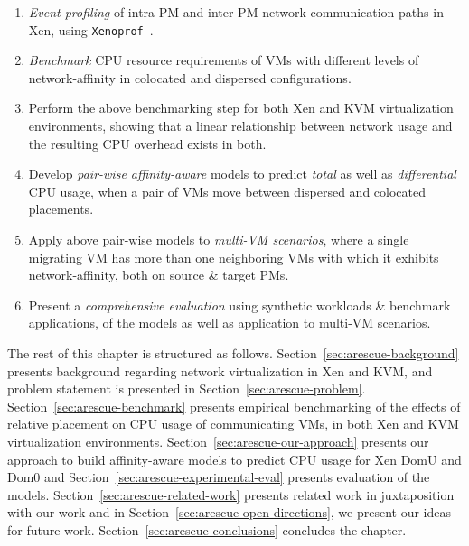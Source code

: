 \begin{enumerate}	
\item \emph{Event profiling} of intra-PM and inter-PM network
	communication paths in Xen, using \texttt{Xenoprof}~\cite{xenoprof}.
\item \emph{Benchmark} CPU resource requirements
of VMs with different levels of network-affinity
in colocated and dispersed configurations.
\item Perform the above benchmarking step for both Xen and KVM virtualization environments,
	showing that a linear relationship between network usage and the resulting CPU overhead
	exists in both.
\item Develop \emph{pair-wise affinity-aware} models to predict \textit{total}
	as well as \textit{differential} CPU usage, when a pair of VMs move between
	dispersed and colocated placements.
\item Apply above pair-wise models to \emph{multi-VM scenarios}, where
	a single migrating VM has more than one neighboring
	VMs with which it exhibits network-affinity, both on source \& target PMs.
\item Present a \emph{comprehensive evaluation} using synthetic 
	workloads \& benchmark applications,
	of the models as well as application to multi-VM scenarios.
\end{enumerate}

\noindent The rest of this chapter is structured as follows. 
Section~\ref{sec:arescue-background}
presents background regarding network virtualization in Xen and KVM, and
problem statement is presented in Section~\ref{sec:arescue-problem}.
Section~\ref{sec:arescue-benchmark}
presents empirical benchmarking of the effects of relative placement on
CPU usage of communicating VMs, in both Xen and KVM virtualization environments.
Section~\ref{sec:arescue-our-approach} presents our approach to
build affinity-aware models to predict CPU usage for Xen DomU and Dom0
and Section~\ref{sec:arescue-experimental-eval} presents evaluation 
of the models.
Section~\ref{sec:arescue-related-work} presents related work in juxtaposition
with our work and 
in Section~\ref{sec:arescue-open-directions}, we
present our ideas for future work.
Section~\ref{sec:arescue-conclusions} concludes the chapter.

